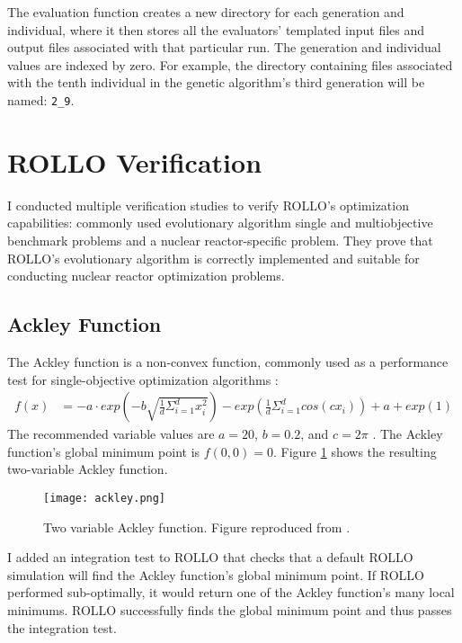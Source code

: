 The evaluation function creates a new directory for each generation and individual, 
where it then stores all the evaluators' templated input files and output files 
associated with that particular run. 
The generation and individual values are indexed by zero. 
For example, the directory containing files associated with the tenth individual in 
the genetic algorithm's third generation will be named: 
\texttt{2\_9}.


\section{ROLLO Verification}
I conducted multiple verification studies to verify \gls{ROLLO}'s optimization capabilities: 
commonly used evolutionary algorithm single and multiobjective benchmark problems and 
a nuclear reactor-specific problem. 
They prove that \gls{ROLLO}'s evolutionary algorithm is correctly implemented 
and suitable for conducting nuclear reactor optimization problems. 

\subsection{Ackley Function}
The Ackley function is a non-convex function, commonly used as a performance test 
for single-objective optimization algorithms \cite{ackley_connectionist_2012}: 
\begin{align}
    f(x) &= -a \cdot exp \left(-b\sqrt{\frac{1}{d}\Sigma_{i=1}^dx_i^2}\right) - 
    exp \left(\frac{1}{d}\Sigma_{i=1}^d cos(cx_i)\right) + a + exp(1) 
\end{align}
The recommended variable values are $a=20$, $b=0.2$, and $c=2\pi$
\cite{sfu_ackley_nodate}. 
The Ackley function's global minimum point is $f(0,0) = 0$. 
Figure \ref{fig:ackley} shows the resulting two-variable Ackley function.
\begin{figure}[htbp]
    \centering
    \texttt{[image: ackley.png]} 
    \caption{Two variable Ackley function. Figure reproduced from \cite{sfu_ackley_nodate}.}
    \label{fig:ackley}
\end{figure}

I added an integration test to \gls{ROLLO} that checks that a default \gls{ROLLO} 
simulation will find the Ackley function's global minimum point. 
If \gls{ROLLO} performed sub-optimally, it would return one of the Ackley 
function's many local minimums. 
\gls{ROLLO} successfully finds the global minimum point and thus passes the 
integration test. 

